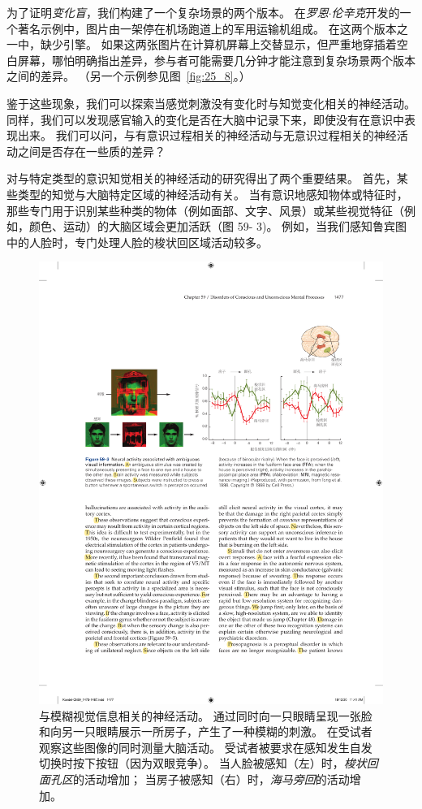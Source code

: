 为了证明\textit{变化盲}，我们构建了一个复杂场景的两个版本。
在\textit{罗恩$\cdot$伦辛克}开发的一个著名示例中，图片由一架停在机场跑道上的军用运输机组成。
在这两个版本之一中，缺少引擎。
如果这两张图片在计算机屏幕上交替显示，但严重地穿插着空白屏幕，哪怕明确指出差异，参与者可能需要几分钟才能注意到复杂场景两个版本之间的差异。
（另一个示例参见图~\ref{fig:25_8}。）


鉴于这些现象，我们可以探索当感觉刺激没有变化时与知觉变化相关的神经活动。
同样，我们可以发现感官输入的变化是否在大脑中记录下来，即使没有在意识中表现出来。
我们可以问，与有意识过程相关的神经活动与无意识过程相关的神经活动之间是否存在一些质的差异？


对与特定类型的意识知觉相关的神经活动的研究得出了两个重要结果。
首先，某些类型的知觉与大脑特定区域的神经活动有关。
当有意识地感知物体或特征时，那些专门用于识别某些种类的物体（例如面部、文字、风景）或某些视觉特征（例如，颜色、运动）的大脑区域会更加活跃（图 59- 3)。
例如，当我们感知鲁宾图中的人脸时，专门处理人脸的梭状回区域活动较多。


\begin{figure}[htbp]
	\centering
	\includegraphics[width=1.0\linewidth]{chap59/fig_59_3}
	\caption{与模糊视觉信息相关的神经活动。
		通过同时向一只眼睛呈现一张脸和向另一只眼睛展示一所房子，产生了一种模糊的刺激。
		在受试者观察这些图像的同时测量大脑活动。
		受试者被要求在感知发生自发切换时按下按钮（因为双眼竞争）。
		当人脸被感知（左）时，\textit{梭状回面孔区}的活动增加；
		当房子被感知（右）时，\textit{海马旁回}的活动增加\cite{tong1998binocular}。}
	\label{fig:59_3}
\end{figure}


